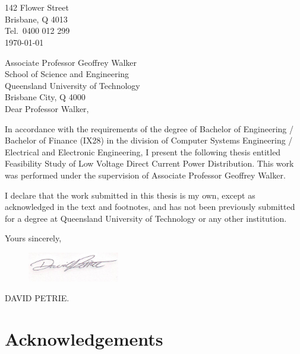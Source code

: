 \newpage


\section*{}

\begin{flushright}
	142 Flower Street\\
	Brisbane, Q 4013\\
	Tel.\ 0400 012 299\\
	\medskip
	\today
\end{flushright}
\begin{flushleft}
  Associate Professor Geoffrey Walker\\
  School of Science and Engineering\\
  Queensland University of Technology\\
  Brisbane City, Q 4000\\
  \bigskip\bigskip
  Dear Professor Walker,
\end{flushleft}

In accordance with the requirements of the degree of Bachelor of
Engineering / Bachelor of Finance (IX28) in the division of Computer Systems
Engineering / Electrical and Electronic Engineering, I present the
following thesis entitled Feasibility Study of Low Voltage Direct Current Power Distribution.  This work was performed under the supervision of Associate Professor Geoffrey Walker.

I declare that the work submitted in this thesis is my own, except as
acknowledged in the text and footnotes, and has not been previously
submitted for a degree at Queensland University of Technology or any other
institution.

\begin{flushright}
	Yours sincerely,\\
	\medskip
	\begin{figure}[H]
	\hfill\includegraphics[width = 40mm]{images/Signature}%
	\end{figure} 
	\medskip
	DAVID PETRIE.
\end{flushright}

\newpage

\section*{Acknowledgements}


